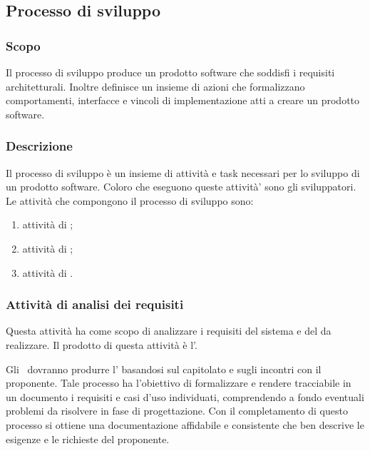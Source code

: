\documentclass[12pt,a4paper]{article}
\begin{document}
\subsection{Processo di sviluppo}

\subsubsection{Scopo}
Il processo di sviluppo produce un prodotto software che soddisfi i requisiti architetturali. Inoltre definisce un insieme di azioni che formalizzano comportamenti, interfacce e vincoli di implementazione atti a creare un prodotto software.

\subsubsection{Descrizione}
Il processo di sviluppo è un insieme di attività e task necessari per lo sviluppo di un prodotto software. Coloro che eseguono queste attività' sono gli sviluppatori. Le attività che compongono il processo di sviluppo sono:
\begin{enumerate}
	\item attività di \FA;
	\item attività di \FPA;
	\item attività di \FPDC.
\end{enumerate}

\subsubsection{Attività di analisi dei requisiti}
Questa attività ha come scopo di analizzare i requisiti del sistema e del  da realizzare. Il prodotto di questa attività è l'\AdR.

Gli \ANpl\ dovranno produrre l'\AdR{} basandosi sul capitolato e sugli incontri con il proponente. Tale processo ha l'obiettivo di formalizzare e rendere tracciabile in un documento i requisiti e casi d'uso individuati, comprendendo a fondo eventuali problemi da risolvere in fase di progettazione. Con il completamento di questo processo si ottiene una documentazione affidabile e consistente che ben descrive le esigenze e le richieste del proponente.
\end{document}

